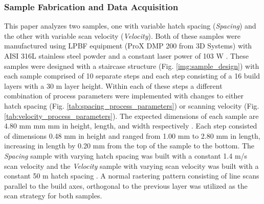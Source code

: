 \subsubsection{Sample Fabrication and Data Acquisition}
This paper analyzes two samples, one with variable hatch spacing
(\textit{Spacing}) and the other with variable scan velocity
(\textit{Velocity}). Both of these samples were manufactured using LPBF
equipment (ProX DMP 200 from 3D Systems) with AISI 316L stainless steel powder
and a constant laser power of 103 W \cite{arnhart_-situ_2022,
mitchell_linking_2020}.  These samples were designed with a staircase structure
(Fig. \ref{img:sample_design}) with each sample comprised of 10 separate steps
and each step consisting of a 16 build layers with a 30 {\textmu}m layer height.
Within each of these steps a different combination of process parameters were
implemented with changes to either hatch spacing (Fig.
\ref{tab:spacing_process_parameters}) or scanning velocity (Fig.
\ref{tab:velocity_process_parameters}). The expected dimensions of each sample
are 4.80 mm \texttimes{} mm \texttimes{} mm in height, length, and width
respectively \cite{arnhart_-situ_2022}. Each step consisted of dimensions 0.48
mm in height and ranged from 1.00 mm to 2.80 mm in length, increasing in length
by 0.20 mm from the top of the sample to the bottom. The \textit{Spacing} sample
with varying hatch spacing was built with a constant 1.4 m/s scan velocity and
the \textit{Velocity} sample with varying scan velocity was built with a
constant 50 {\textmu}m hatch spacing \cite{arnhart_-situ_2022}. A normal
rastering pattern consisting of line scans parallel to the build axes,
orthogonal to the previous layer was utilized as the scan strategy for both
samples.

